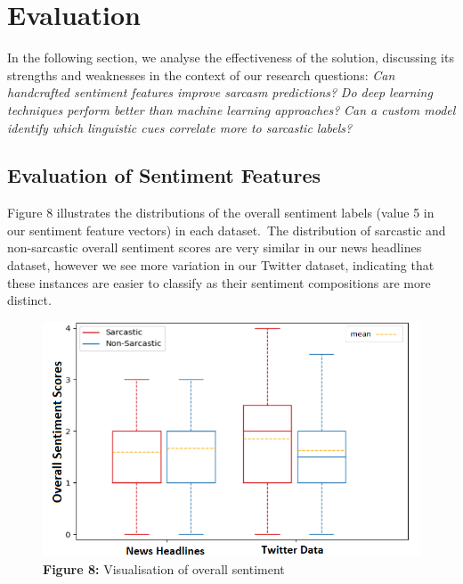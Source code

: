 \documentclass[12pt,a4paper]{article}
\begin{document}
\section{Evaluation}
\noindent In the following section, we analyse the effectiveness of the solution, discussing its strengths and weaknesses in the context of our research questions: \textit{Can handcrafted sentiment features improve sarcasm predictions?} \textit{Do deep learning techniques perform better than machine learning approaches?} \textit{Can a custom model identify which linguistic cues correlate more to sarcastic labels?}\\\vspace{-10pt}


\subsection{Evaluation of Sentiment Features}\vspace{-10pt}
\hspace{-18pt}\begin{minipage}{0.45\textwidth}
	Figure 8 illustrates the distributions of the overall sentiment labels (value 5 in our sentiment feature vectors) in each dataset.\ The distribution of sarcastic and non-sarcastic overall sentiment scores are very similar in our news headlines dataset, however we see more variation in our Twitter dataset, indicating that these instances are easier to classify as their sentiment compositions are more distinct.
\end{minipage}\vspace{-3pt}
\begin{minipage}{0.5\textwidth}
	\begin{figure}[H]
		\begin{center}
			\includegraphics[width=1\textwidth]{Images/boxcompare.png}\\
			\textbf{Figure 8:} Visualisation of overall sentiment\\
		\end{center}
	\end{figure}
\end{minipage}
\end{document}
